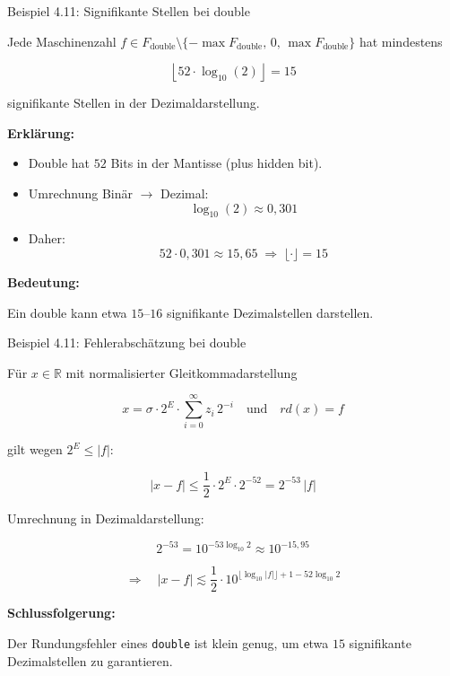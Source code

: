 \documentclass{beamer}
\begin{document}
\begin{frame}{Beispiel 4.11: Signifikante Stellen bei double}

\scriptsize

Jede Maschinenzahl \(f \in F_{\text{double}} \setminus \{-\max F_{\text{double}},\,0,\,\max F_{\text{double}}\}\)
hat mindestens

\[
\left\lfloor 52 \cdot \log_{10}(2) \right\rfloor = 15
\]

signifikante Stellen in der Dezimaldarstellung.

\vspace{0.3cm}

\textbf{Erklärung:}

\begin{itemize}
\item Double hat \(52\) Bits in der Mantisse (plus hidden bit).
\item Umrechnung Binär \(\rightarrow\) Dezimal:
\[
\log_{10}(2) \approx 0{,}301
\]
\item Daher:
\[
52 \cdot 0{,}301 \approx 15{,}65 \;\Rightarrow\; \lfloor \cdot \rfloor = 15
\]
\end{itemize}

\vspace{0.3cm}

\textbf{Bedeutung:}

Ein double kann etwa \(15\)–\(16\) signifikante Dezimalstellen darstellen.

\end{frame}

\begin{frame}{Beispiel 4.11: Fehlerabschätzung bei double}

\scriptsize

Für \(x\in\mathbb{R}\) mit normalisierter Gleitkommadarstellung

\[
x = \sigma \cdot 2^E \cdot \sum_{i=0}^{\infty} z_i\,2^{-i}
\quad \text{und} \quad rd(x)=f
\]

gilt wegen \(2^E \le |f|\):

\[
|x-f|
\le
\frac12 \cdot 2^E \cdot 2^{-52}
=
2^{-53}\,|f|
\]

\vspace{0.3cm}

Umrechnung in Dezimaldarstellung:

\[
2^{-53}
=
10^{-53\log_{10}2}
\approx 10^{-15{,}95}
\]

\[
\Rightarrow\quad
|x-f|
\lesssim
\frac12 \cdot 10^{\lfloor \log_{10}|f|\rfloor +1 - 52\log_{10}2}
\]

\vspace{0.3cm}

\textbf{Schlussfolgerung:}

Der Rundungsfehler eines \texttt{double} ist klein genug,
um etwa \(15\) signifikante Dezimalstellen zu garantieren.

\end{frame}
\end{document}
